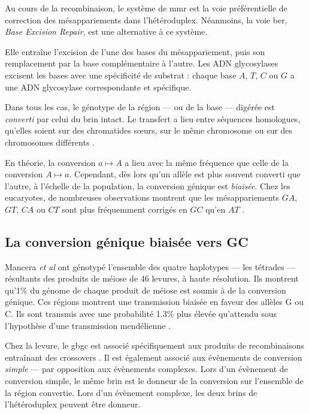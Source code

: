 \documentclass[11pt, oneside]{scrartcl}
\begin{document}
Au cours de la recombinaison, le système de \ac{mmr} est la voie préférentielle
de correction des mésappariements dans l'hétéroduplex. Néanmoins, la voie
\ac{ber}, \emph{Base Excision Repair}, est une alternative à ce système.

Elle entraîne l'excision de l'une des bases du mésappariement, puis son
remplacement par la base complémentaire à l'autre. Les ADN glycosylases excisent
les bases avec une spécificité de substrat : chaque base \(A\), \(T\), \(C\) ou \(G\) a
une ADN glycosylase correspondante et spécifique.

Dans tous les cas, le génotype de la région --- ou de la base --- digérée est
\emph{converti} par celui du brin intact. Le transfert a lieu entre séquences
homologues, qu'elles soient sur des chromatides sœurs, sur le même chromosome ou
sur des chromosomes différents \cite{chen_gene_2007}.

\begin{transition}

En théorie, la conversion $a \mapsto A$ a lieu avec la même fréquence que celle
de la conversion $A \mapsto a$. Cependant, dès lors qu'un allèle est plus
souvent converti que l'autre, à l'échelle de la population, la conversion
génique est {\em biaisée}. Chez les eucaryotes, de nombreuses observations montrent
que les mésappariements $GA$, $GT$, $CA$ ou $CT$ sont plus fréquemment corrigés
en $GC$ qu'en $AT$ \cite{duret_biased_2009}. 

\end{transition}

\subsection{La conversion génique biaisée vers GC}
\label{sec:orgheadline7}


Mancera \emph{et al} \cite{mancera_high-resolution_2008} ont génotypé l'ensemble des
quatre haplotypes --- les tétrades --- résultants des produits de méiose de 46
levures, à haute résolution. Ils montrent qu'1\% du génome de chaque produit de
méiose est soumis à de la conversion génique. Ces régions montrent une
transmission biaisée en faveur des allèles G ou C. Ils sont transmis avec une
probabilité 1.3\% plus élevée qu'attendu sous l'hypothèse d'une transmission
mendélienne \cite{mancera_high-resolution_2008}. 

Chez la levure, le \ac{gbgc} est associé spécifiquement aux produits de
recombinaisons entraînant des crossovers \cite{lesecque_gc-biased_2013}. Il est
également associé aux évènements de conversion \emph{simple} --- par opposition aux
évènements complexes. Lors d'un évènement de conversion simple, le même brin est
le donneur de la conversion sur l'ensemble de la région convertie. Lors d'un
évènement complexe, les deux brins de l'hétéroduplex peuvent être donneur. 
\end{document}
